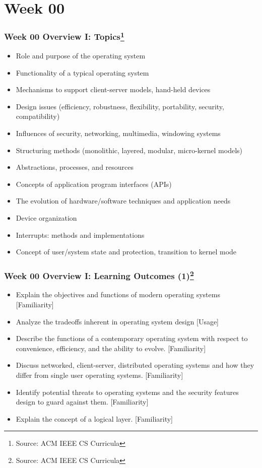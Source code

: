 
\section{Week 00}
\begin{frame}[fragile]
\frametitle{Week 00 Overview I:
Topics\footnote{Source: ACM IEEE CS Curricula}}

\begin{itemize}
\item Role and purpose of the operating system 
\item Functionality of a typical operating system 
\item Mechanisms to support client-server models, hand-held devices 
\item Design issues (efficiency, robustness, flexibility, portability, security, compatibility) 
\item Influences of security, networking, multimedia, windowing systems 
\item Structuring methods (monolithic, layered, modular, micro-kernel models) 
\item Abstractions, processes, and resources 
\item Concepts of application program interfaces (APIs) 
\item The evolution of hardware/software techniques and application needs 
\item Device organization 
\item Interrupts: methods and implementations 
\item Concept of user/system state and protection, transition to kernel mode 
\end{itemize}
\end{frame}

\begin{frame}[fragile]
\frametitle{Week 00 Overview I:
Learning Outcomes (1)\footnote{Source: ACM IEEE CS Curricula}}
\begin{itemize}
\item Explain the objectives and functions of modern operating systems [Familiarity]
\item Analyze the tradeoffs inherent in operating system design [Usage]
\item Describe the functions of a contemporary operating system with respect to convenience, efficiency, and the ability to evolve. [Familiarity] 
\item Discuss networked, client-server, distributed operating systems and how they differ from single user operating systems. [Familiarity] 
\item Identify potential threats to operating systems and the security features design to guard against them. [Familiarity] 
\item Explain the concept of a logical layer.  [Familiarity] 
\end{itemize}
\end{frame}


